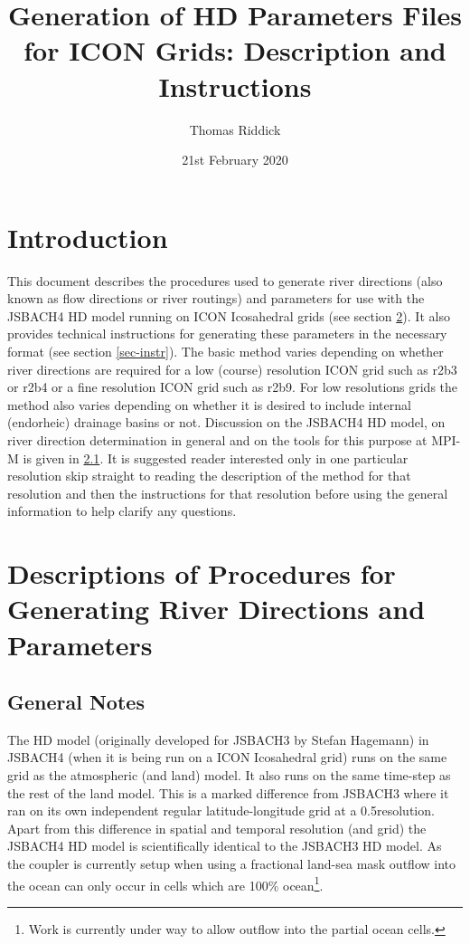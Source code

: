 \documentclass{article}
\title{Generation of HD Parameters Files for ICON Grids: Description and Instructions}
\author{Thomas Riddick}
\date{21st February 2020}
\begin{document}
\maketitle
\tableofcontents
\newpage
\lstset{language=bash}
\section{Introduction}
This document describes the procedures used to generate river directions (also known as flow directions or river routings) and parameters for use with the JSBACH4 HD model running on ICON Icosahedral grids (see section \ref{sec-desc}). It also provides technical instructions for generating these parameters in the necessary format (see section \ref{sec-instr}). The basic method varies depending on whether river directions are required for a low (course) resolution ICON grid such as r2b3 or r2b4 or a fine resolution ICON grid such as r2b9. For low resolutions grids the method also varies depending on whether it is desired to include internal (endorheic) drainage basins or not. Discussion on the JSBACH4 HD model, on river direction determination in general and on the tools for this purpose at MPI-M is given in \ref{sub-sec-desc-gen-notes}. It is suggested reader interested only in one particular resolution skip straight to reading the description of the method for that resolution and then the instructions for that resolution before using the general information to help clarify any questions.
\section{Descriptions of Procedures for Generating River Directions and Parameters} \label{sec-desc}
\subsection{General Notes} \label{sub-sec-desc-gen-notes}
The HD model (originally developed for JSBACH3 by Stefan Hagemann\cite{Hagemann:1998aa,Hagemann:1998ab,JGRD:JGRD8049}) in JSBACH4 (when it is being run on a ICON Icosahedral grid) runs on the same grid as the atmospheric (and land) model. It also runs on the same time-step as the rest of the land model. This is a marked difference from JSBACH3 where it ran on its own independent regular latitude-longitude grid at a 0.5\degree resolution. Apart from this difference in spatial and temporal resolution (and grid) the JSBACH4 HD model is scientifically identical to the JSBACH3 HD model. As the coupler is currently setup when using a fractional land-sea mask outflow into the ocean can only occur in cells which are 100\% ocean\footnote{Work is currently under way to allow outflow into the partial ocean cells.}. 
\end{document}
